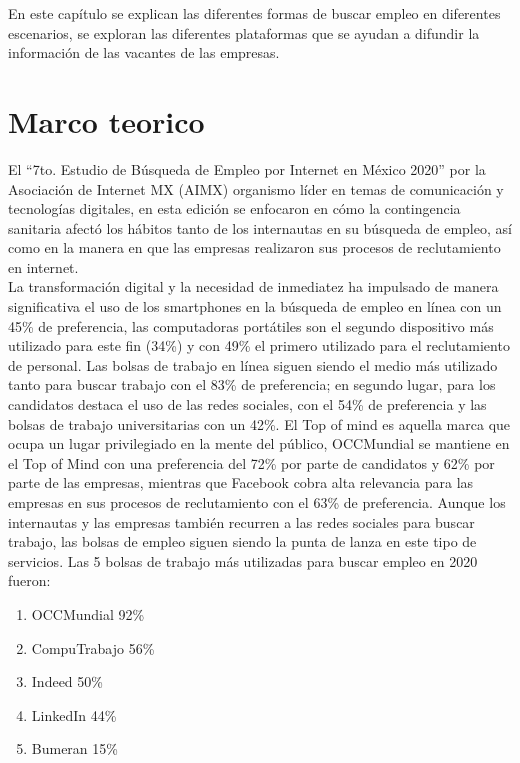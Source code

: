 \selectfont

En este capítulo se explican las diferentes formas de buscar empleo en diferentes escenarios, se 
exploran las diferentes plataformas que se ayudan a difundir la información de las vacantes de las empresas.

\section{Marco teorico}
    El ``7to. Estudio de Búsqueda de Empleo por Internet en México 2020'' por la Asociación de Internet MX (AIMX)
    organismo líder en temas de comunicación y tecnologías digitales, en esta edición se enfocaron en cómo la
    contingencia sanitaria afectó los hábitos tanto de los internautas en su búsqueda de empleo, así como en la manera en
    que las empresas realizaron sus procesos de reclutamiento en internet.\\
    \newline
    La transformación digital y la necesidad de inmediatez ha impulsado de manera significativa el uso de los smartphones
    en la búsqueda de empleo en línea con un 45\% de preferencia, las computadoras portátiles son el segundo dispositivo
    más utilizado para este fin (34\%) y con 49\% el primero utilizado para el reclutamiento de personal. Las bolsas de
    trabajo en línea siguen siendo el medio más utilizado tanto para buscar trabajo con el 83\% de preferencia; en segundo
    lugar, para los candidatos destaca el uso de las redes sociales, con el 54\% de preferencia y las bolsas de trabajo
    universitarias con un 42\%. 
    El Top of mind es aquella marca que ocupa un lugar privilegiado en la mente del público, OCCMundial se mantiene
    en el Top of Mind con una preferencia del 72\% por parte de candidatos y 62\% por parte de las empresas, mientras que
    Facebook cobra alta relevancia para las empresas en sus procesos de reclutamiento con el 63\% de preferencia.
    Aunque los internautas y las empresas también recurren a las redes sociales para buscar trabajo, las bolsas de empleo
    siguen siendo la punta de lanza en este tipo de servicios. Las 5 bolsas de trabajo más utilizadas para buscar empleo en
    2020 fueron:
    \begin{enumerate}
        \item OCCMundial 92\%
        \item CompuTrabajo 56\%
        \item Indeed 50\%
        \item LinkedIn 44\%
        \item Bumeran 15\%
    \end{enumerate}
    \newline

